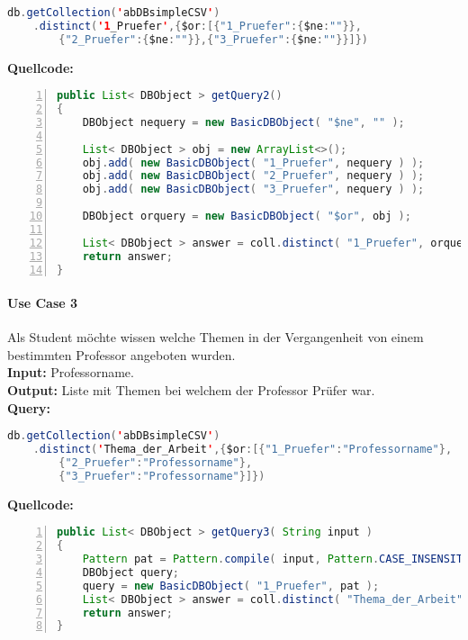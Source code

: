 \begin{lstlisting}[caption={Query zu Use Case 2},language=java,captionpos=t,numbers=none, numberstyle=\tiny,basicstyle=\scriptsize,breaklines=true]
db.getCollection('abDBsimpleCSV')
	.distinct('1_Pruefer',{$or:[{"1_Pruefer":{$ne:""}},
		{"2_Pruefer":{$ne:""}},{"3_Pruefer":{$ne:""}}]})
\end{lstlisting}\label{lst:query2}

\textbf{Quellcode:}

\begin{lstlisting}[caption={Quellcode zu Use Case 2},language=java,captionpos=t,numbers=left, numberstyle=\tiny,basicstyle=\scriptsize,breaklines=true]
public List< DBObject > getQuery2()
{
    DBObject nequery = new BasicDBObject( "$ne", "" );
    
    List< DBObject > obj = new ArrayList<>();
    obj.add( new BasicDBObject( "1_Pruefer", nequery ) );
    obj.add( new BasicDBObject( "2_Pruefer", nequery ) );
    obj.add( new BasicDBObject( "3_Pruefer", nequery ) );
    
    DBObject orquery = new BasicDBObject( "$or", obj );
    
    List< DBObject > answer = coll.distinct( "1_Pruefer", orquery );
    return answer;
}
\end{lstlisting}\label{lst:query2code}

\paragraph{Use Case 3} Als Student möchte wissen welche Themen in der Vergangenheit von einem bestimmten Professor angeboten wurden. \\
\textbf{Input:} Professorname. \\
\textbf{Output:} Liste mit Themen bei welchem der Professor Prüfer war. \\
\textbf{Query:}

\begin{lstlisting}[caption={Query zu Use Case 3},language=java,captionpos=t,numbers=none, numberstyle=\tiny,basicstyle=\scriptsize,breaklines=true]
db.getCollection('abDBsimpleCSV')
	.distinct('Thema_der_Arbeit',{$or:[{"1_Pruefer":"Professorname"},
		{"2_Pruefer":"Professorname"},
		{"3_Pruefer":"Professorname"}]})
\end{lstlisting}\label{lst:query3}

\textbf{Quellcode:}

\begin{lstlisting}[caption={Quellcode zu Use Case 3},language=java,captionpos=t,numbers=left, numberstyle=\tiny,basicstyle=\scriptsize,breaklines=true]
public List< DBObject > getQuery3( String input )
{
    Pattern pat = Pattern.compile( input, Pattern.CASE_INSENSITIVE );
    DBObject query;
    query = new BasicDBObject( "1_Pruefer", pat );
    List< DBObject > answer = coll.distinct( "Thema_der_Arbeit", query );
    return answer;
}
\end{lstlisting}\label{lst:query3code}

